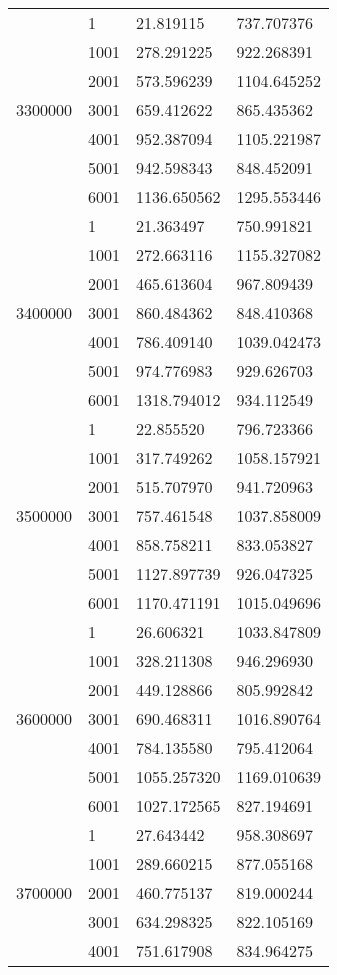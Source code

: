 \begin{table}[htb!]
\begin{tabular}{llll}
\multirow[c]{7}{*}{3300000} & 1 & 21.819115 & 737.707376 \\
 & 1001 & 278.291225 & 922.268391 \\
 & 2001 & 573.596239 & 1104.645252 \\
 & 3001 & 659.412622 & 865.435362 \\
 & 4001 & 952.387094 & 1105.221987 \\
 & 5001 & 942.598343 & 848.452091 \\
 & 6001 & 1136.650562 & 1295.553446 \\
\multirow[c]{7}{*}{3400000} & 1 & 21.363497 & 750.991821 \\
 & 1001 & 272.663116 & 1155.327082 \\
 & 2001 & 465.613604 & 967.809439 \\
 & 3001 & 860.484362 & 848.410368 \\
 & 4001 & 786.409140 & 1039.042473 \\
 & 5001 & 974.776983 & 929.626703 \\
 & 6001 & 1318.794012 & 934.112549 \\
\multirow[c]{7}{*}{3500000} & 1 & 22.855520 & 796.723366 \\
 & 1001 & 317.749262 & 1058.157921 \\
 & 2001 & 515.707970 & 941.720963 \\
 & 3001 & 757.461548 & 1037.858009 \\
 & 4001 & 858.758211 & 833.053827 \\
 & 5001 & 1127.897739 & 926.047325 \\
 & 6001 & 1170.471191 & 1015.049696 \\
\multirow[c]{7}{*}{3600000} & 1 & 26.606321 & 1033.847809 \\
 & 1001 & 328.211308 & 946.296930 \\
 & 2001 & 449.128866 & 805.992842 \\
 & 3001 & 690.468311 & 1016.890764 \\
 & 4001 & 784.135580 & 795.412064 \\
 & 5001 & 1055.257320 & 1169.010639 \\
 & 6001 & 1027.172565 & 827.194691 \\
\multirow[c]{7}{*}{3700000} & 1 & 27.643442 & 958.308697 \\
 & 1001 & 289.660215 & 877.055168 \\
 & 2001 & 460.775137 & 819.000244 \\
 & 3001 & 634.298325 & 822.105169 \\
 & 4001 & 751.617908 & 834.964275 \\

\end{tabular}
\end{table}
